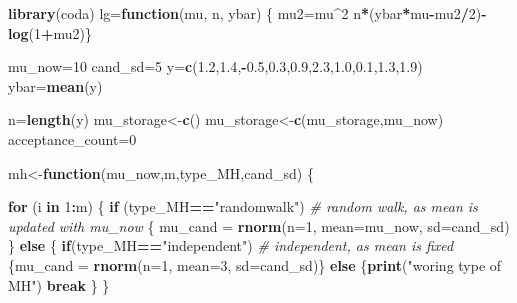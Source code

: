 \documentclass[]{book}
\newenvironment{Shaded}{\begin{snugshade}}{\end{snugshade}}
\newcommand{\KeywordTok}[1]{\textcolor[rgb]{0.13,0.29,0.53}{\textbf{#1}}}
\newcommand{\DataTypeTok}[1]{\textcolor[rgb]{0.13,0.29,0.53}{#1}}
\newcommand{\DecValTok}[1]{\textcolor[rgb]{0.00,0.00,0.81}{#1}}
\newcommand{\FloatTok}[1]{\textcolor[rgb]{0.00,0.00,0.81}{#1}}
\newcommand{\StringTok}[1]{\textcolor[rgb]{0.31,0.60,0.02}{#1}}
\newcommand{\CommentTok}[1]{\textcolor[rgb]{0.56,0.35,0.01}{\textit{#1}}}
\newcommand{\ControlFlowTok}[1]{\textcolor[rgb]{0.13,0.29,0.53}{\textbf{#1}}}
\newcommand{\OperatorTok}[1]{\textcolor[rgb]{0.81,0.36,0.00}{\textbf{#1}}}
\newcommand{\NormalTok}[1]{#1}
\begin{document}
\begin{Shaded}
\begin{Highlighting}[]
\KeywordTok{library}\NormalTok{(coda)}
\NormalTok{lg=}\ControlFlowTok{function}\NormalTok{(mu, n, ybar)}
\NormalTok{\{ mu2=mu}\OperatorTok{^}\DecValTok{2}
\NormalTok{n}\OperatorTok{*}\NormalTok{(ybar}\OperatorTok{*}\NormalTok{mu}\OperatorTok{-}\NormalTok{mu2}\OperatorTok{/}\DecValTok{2}\NormalTok{)}\OperatorTok{-}\KeywordTok{log}\NormalTok{(}\DecValTok{1}\OperatorTok{+}\NormalTok{mu2)\}}

\NormalTok{mu_now=}\DecValTok{10}
\NormalTok{cand_sd=}\DecValTok{5}
\NormalTok{y=}\KeywordTok{c}\NormalTok{(}\FloatTok{1.2}\NormalTok{,}\FloatTok{1.4}\NormalTok{,}\OperatorTok{-}\FloatTok{0.5}\NormalTok{,}\FloatTok{0.3}\NormalTok{,}\FloatTok{0.9}\NormalTok{,}\FloatTok{2.3}\NormalTok{,}\FloatTok{1.0}\NormalTok{,}\FloatTok{0.1}\NormalTok{,}\FloatTok{1.3}\NormalTok{,}\FloatTok{1.9}\NormalTok{)}
\NormalTok{ybar=}\KeywordTok{mean}\NormalTok{(y)}

\NormalTok{n=}\KeywordTok{length}\NormalTok{(y)}
\NormalTok{mu_storage<-}\KeywordTok{c}\NormalTok{()}
\NormalTok{mu_storage<-}\KeywordTok{c}\NormalTok{(mu_storage,mu_now)}
\NormalTok{acceptance_count=}\DecValTok{0}

\NormalTok{mh<-}\ControlFlowTok{function}\NormalTok{(mu_now,m,type_MH,cand_sd)}
\NormalTok{\{}
  
  \ControlFlowTok{for}\NormalTok{ (i }\ControlFlowTok{in} \DecValTok{1}\OperatorTok{:}\NormalTok{m)}
\NormalTok{  \{}
    \ControlFlowTok{if}\NormalTok{ (type_MH}\OperatorTok{==}\StringTok{"randomwalk"}\NormalTok{)  }\CommentTok{# random walk, as mean is updated with mu_now}
\NormalTok{    \{}
\NormalTok{      mu_cand =}\StringTok{ }\KeywordTok{rnorm}\NormalTok{(}\DataTypeTok{n=}\DecValTok{1}\NormalTok{, }\DataTypeTok{mean=}\NormalTok{mu_now, }\DataTypeTok{sd=}\NormalTok{cand_sd)}
\NormalTok{    \}}
    \ControlFlowTok{else}
\NormalTok{    \{}
      \ControlFlowTok{if}\NormalTok{(type_MH}\OperatorTok{==}\StringTok{"independent"}\NormalTok{)  }\CommentTok{# independent, as mean is fixed}
\NormalTok{      \{mu_cand =}\StringTok{ }\KeywordTok{rnorm}\NormalTok{(}\DataTypeTok{n=}\DecValTok{1}\NormalTok{, }\DataTypeTok{mean=}\DecValTok{3}\NormalTok{, }\DataTypeTok{sd=}\NormalTok{cand_sd)\}}
      \ControlFlowTok{else}
\NormalTok{      \{}\KeywordTok{print}\NormalTok{(}\StringTok{"woring type of MH"}\NormalTok{)}
        \ControlFlowTok{break}
\NormalTok{      \}}
\NormalTok{    \}}
    

\end{Highlighting}
\end{Shaded}
\end{document}
